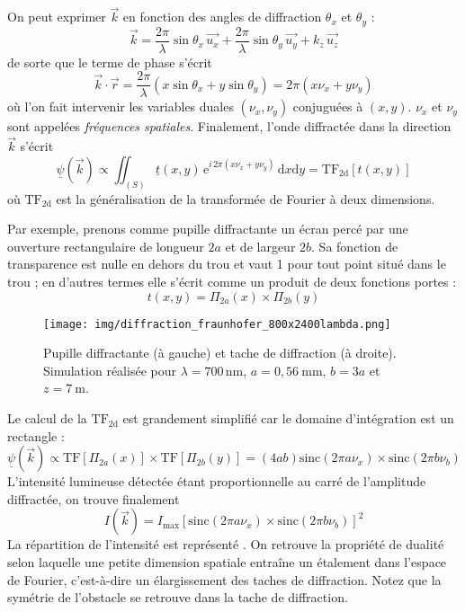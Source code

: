 On peut exprimer \(\overrightarrow{k}\) en fonction des angles de diffraction \(\theta_x\) et \(\theta_y\) :
\[
	\overrightarrow{k}=\frac{2\pi}{\lambda}\sin\theta_x\,\overrightarrow{u_x}+
	\frac{2\pi}{\lambda}\sin\theta_y\,\overrightarrow{u_y}+
	k_z\,\overrightarrow{u_z}
\]
de sorte que le terme de phase s'écrit
\[
	\overrightarrow{k}\cdot \overrightarrow{r}=\frac{2\pi}{\lambda}(x\sin\theta_x+y\sin\theta_y)=2\pi(x\nu_x+y\nu_y)
\]
où l'on fait intervenir les variables duales \((\nu_x,\nu_y)\) conjuguées à \((x,y)\). \(\nu_x\) et \(\nu_y\) sont appelées \emph{fréquences spatiales}. Finalement, l'onde diffractée dans la direction \(\overrightarrow{k}\) s'écrit
\begin{equation}
\underline{\psi}(\overrightarrow{k})\propto
\iint_{(S)}\underline{t}(x,y)\,\mathrm{e}^{i\, 2\pi(x\nu_x+y\nu_y)}\, \mathrm{d}x \mathrm{d}y=\mathrm{TF_{2d}}[t(x,y)]
\label{eq:TF-de-la-transmittance}
\end{equation}
où \(\mathrm{TF_{2d}}\) est la généralisation de la transformée de Fourier à deux dimensions.

Par exemple, prenons comme pupille diffractante un écran percé par une ouverture rectangulaire de longueur \(2a\) et de largeur \(2b\). Sa fonction de transparence est nulle en dehors du trou et vaut 1 pour tout point situé dans le trou ; en d'autres termes elle s'écrit comme un produit de deux fonctions portes :
\[
	t(x,y)=\Pi_{2a}(x)\times \Pi_{2b}(y)
\]
\begin{figure}[htbp]
	\centering
	\texttt{[image: img/diffraction\_fraunhofer\_800x2400lambda.png]}
	\caption[Pupille diffractante et tache de diffraction associée]{Pupille diffractante (à gauche) et tache de diffraction (à droite). Simulation réalisée pour \(\lambda=700\,\mathrm{nm}\), \(a=0{,}56~\mathrm{mm}\), \(b=3a\) et \(z=7~\mathrm{m}\).}
\end{figure}
Le calcul de la \(\mathrm{TF_{2d}}\) est grandement simplifié car le domaine d'intégration est un rectangle :
\[
	\underline{\psi}(\overrightarrow{k})\propto \mathrm{TF}[\Pi_{2a}(x)]\times \mathrm{TF}[\Pi_{2b}(y)]=
	(4ab)\mathrm{sinc}(2\pi a\nu_x)\times \mathrm{sinc}(2\pi b\nu_b)
\]
L'intensité lumineuse détectée étant proportionnelle au carré de l'amplitude diffractée, on trouve finalement
\[
	I(\overrightarrow{k})=I_\text{max}\left[\mathrm{sinc}(2\pi a\nu_x)\times \mathrm{sinc}(2\pi b\nu_b)\right]^2
\]
La répartition de l'intensité est représenté . On retrouve la propriété de dualité selon laquelle une petite dimension spatiale entraîne un étalement dans l'espace de Fourier, c'est-à-dire un élargissement des taches de diffraction. Notez que la symétrie de l'obstacle se retrouve dans la tache de diffraction.

